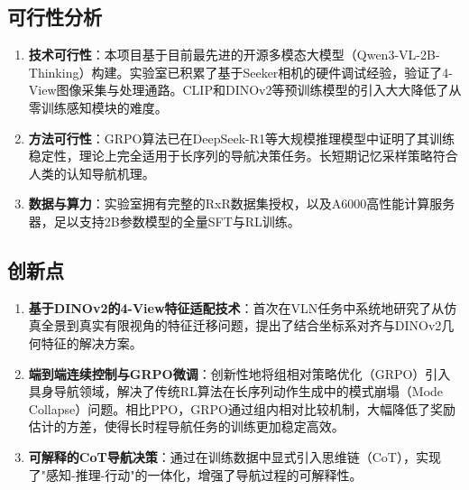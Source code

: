 \subsection{可行性分析}
\begin{enumerate}
    \item \textbf{技术可行性}：本项目基于目前最先进的开源多模态大模型（Qwen3-VL-2B-Thinking）构建。实验室已积累了基于Seeker相机的硬件调试经验，验证了4-View图像采集与处理通路。CLIP和DINOv2\cite{dinov2}等预训练模型的引入大大降低了从零训练感知模块的难度。
    \item \textbf{方法可行性}：GRPO算法\cite{deepseek_r1}已在DeepSeek-R1等大规模推理模型中证明了其训练稳定性，理论上完全适用于长序列的导航决策任务。长短期记忆采样策略符合人类的认知导航机理。
    \item \textbf{数据与算力}：实验室拥有完整的RxR\cite{ku2020rxr}数据集授权，以及A6000高性能计算服务器，足以支持2B参数模型的全量SFT与RL训练。
\end{enumerate}

\subsection{创新点}
\begin{enumerate}
    \item \textbf{基于DINOv2的4-View特征适配技术}：首次在VLN任务中系统地研究了从仿真全景到真实有限视角的特征迁移问题，提出了结合坐标系对齐与DINOv2几何特征的解决方案。
    \item \textbf{端到端连续控制与GRPO微调}：创新性地将组相对策略优化（GRPO）引入具身导航领域，解决了传统RL算法在长序列动作生成中的模式崩塌（Mode Collapse）问题。相比PPO，GRPO通过组内相对比较机制，大幅降低了奖励估计的方差，使得长时程导航任务的训练更加稳定高效。
    \item \textbf{可解释的CoT导航决策}：通过在训练数据中显式引入思维链（CoT），实现了"感知-推理-行动"的一体化，增强了导航过程的可解释性。
\end{enumerate}
